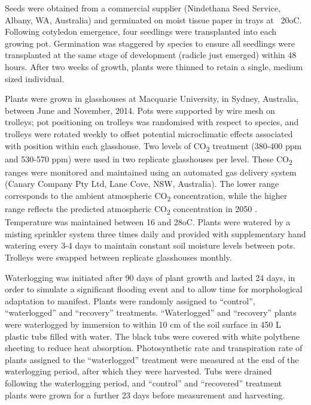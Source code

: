 \documentclass[12pt,a4paper]{memoir}
\begin{document}
Seeds were obtained from a commercial supplier (Nindethana Seed Service, Albany, WA, Australia) and germinated on moist tissue paper in trays at ~20oC. Following cotyledon emergence, four seedlings were transplanted into each growing pot. Germination was staggered by species to ensure all seedlings were transplanted at the same stage of development (radicle just emerged) within 48 hours. After two weeks of growth, plants were thinned to retain a single, medium sized individual.

Plants were grown in glasshouses at Macquarie University, in Sydney, Australia, between June and November, 2014. Pots were supported by wire mesh on trolleys; pot positioning on trolleys was randomised with respect to species, and trolleys were rotated weekly to offset potential microclimatic effects associated with position within each glasshouse. Two levels of CO\textsubscript{2} treatment (380-400 ppm and 530-570 ppm) were used in two replicate glasshouses per level. These CO\textsubscript{2} ranges were monitored and maintained using an automated gas delivery system (Canary Company Pty Ltd, Lane Cove, NSW, Australia). The lower range corresponds to the ambient atmospheric CO\textsubscript{2} concentration, while the higher range reflects the predicted atmospheric CO\textsubscript{2} concentration in 2050 \citep{IPCC2014}. Temperature was maintained between 16 and 28oC. Plants were watered by a misting sprinkler system three times daily and provided with supplementary hand watering every 3-4 days to maintain constant soil moisture levels between pots. Trolleys were swapped between replicate glasshouses monthly.

Waterlogging was initiated after 90 days of plant growth and lasted 24 days, in order to simulate a significant flooding event and to allow time for morphological adaptation to manifest. Plants were randomly assigned to “control”, “waterlogged” and “recovery” treatments. “Waterlogged” and “recovery” plants were waterlogged by immersion to within 10 cm of the soil surface in 450 L plastic tubs filled with water. The black tubs were covered with white polythene sheeting to reduce heat absorption. Photosynthetic rate and transpiration rate of plants assigned to the “waterlogged” treatment were measured at the end of the waterlogging period, after which they were harvested. Tubs were drained following the waterlogging period, and “control” and “recovered” treatment plants were grown for a further 23 days before measurement and harvesting.
\end{document}
